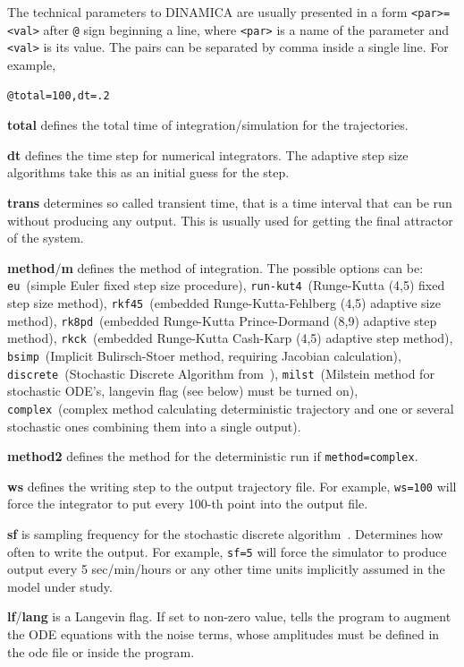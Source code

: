 \documentclass[11pt,a4paper]{article}
\begin{document}
The technical parameters to DINAMICA are usually presented in a form
\verb-<par>=<val>- after \verb-@- sign beginning a line, where \verb-<par>- is a name
of the parameter and \verb-<val>- is its value. The pairs can be separated by comma
inside a single line. For example,
\begin{verbatim}
@total=100,dt=.2
\end{verbatim}

\textbf{total} defines the total time of integration/simulation for the trajectories.

\textbf{dt} defines the time step for numerical integrators. The adaptive step size
algorithms take this as an initial guess for the step.

\textbf{trans} determines so called transient time, that is a time interval that can be
run without producing any output. This is usually used for getting the final
attractor of the system.

\textbf{method}/\textbf{m} defines the method of integration. The possible options can
be: \verb-eu-~(simple Euler fixed step size procedure), \verb=run-kut4=~(Runge-Kutta
(4,5) fixed step size method), \verb-rkf45-~(embedded Runge-Kutta-Fehlberg (4,5)
adaptive size method), \verb-rk8pd-~(embedded Runge-Kutta Prince-Dormand (8,9)
adaptive step method), \verb-rkck-~(embedded Runge-Kutta Cash-Karp (4,5) adaptive
step method), \verb-bsimp-~(Implicit Bulirsch-Stoer method, requiring Jacobian
calculation), \verb-discrete-~(Stochastic Discrete Algorithm from~\cite{GillAlg}),
\verb-milst-~(Milstein method for stochastic ODE's, langevin flag (see below) must be
turned on), \verb-complex-~(complex method calculating deterministic trajectory and
one or several stochastic ones combining them into a single output).

\textbf{method2} defines the method for the deterministic run if
\verb-method=complex-.

\textbf{ws} defines the writing step to the output trajectory file. For example,
\verb-ws=100- will force the integrator to put every 100-th point into the output
file.

\textbf{sf} is sampling frequency for the stochastic discrete
algorithm~\cite{GillAlg}. Determines how often to write the output. For example,
\verb-sf=5- will force the simulator to produce output every 5 sec/min/hours or any
other time units implicitly assumed in the model under study.

\textbf{lf}/\textbf{lang} is a Langevin flag. If set to non-zero value, tells the
program to augment the ODE equations with the noise terms, whose amplitudes must be
defined in the ode file or inside the program.
\end{document}
